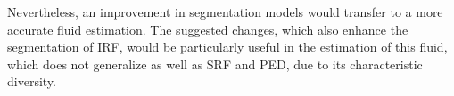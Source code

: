 \par
Nevertheless, an improvement in segmentation models would transfer to a more accurate fluid estimation. The suggested changes, which also enhance the segmentation of IRF, would be particularly useful in the estimation of this fluid, which does not generalize as well as SRF and PED, due to its characteristic diversity.
